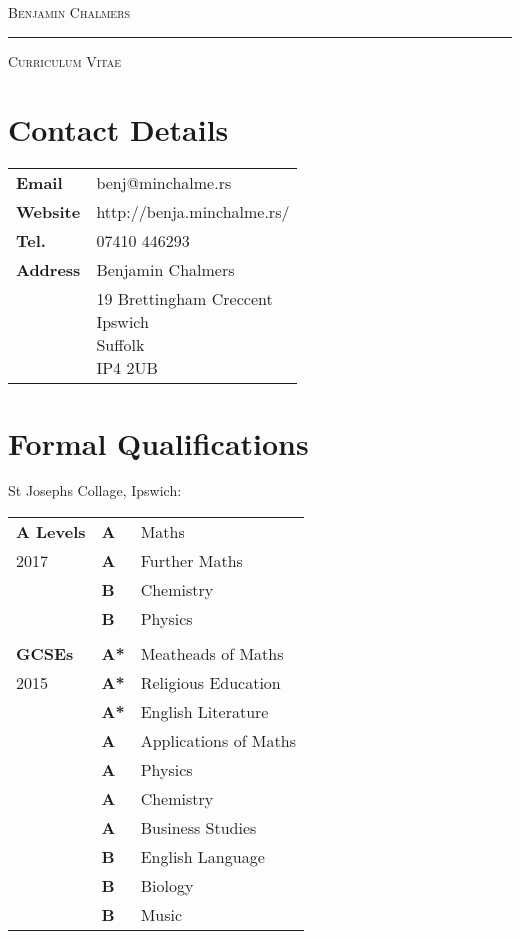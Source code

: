 \documentclass[9pt,a4paper]{article}
\begin{document}
\begin{center}

  \textsc{\Huge{Benjamin Chalmers}}
  \vspace{0.3cm}

  \noindent\rule{0.8\textwidth}{0.4pt}
  \vspace{0.3cm}

  \textsc{\large{Curriculum Vitae}}
  \vspace{0.2cm}

\end{center}
\begin{multicols*}{2}
  \section*{Contact Details} 
\begin{center}
  \begin{tabular}{p{2cm}p{6cm}}
    \textbf{Email}&benj@minchalme.rs\\
    \textbf{Website}&http://benja.minchalme.rs/\\
    \textbf{Tel.}&07410 446293\\
    \textbf{Address}&Benjamin Chalmers\\
    &\parbox{5cm}{19 Brettingham Creccent\\Ipswich\\Suffolk\\IP4 2UB}\\
  \end{tabular}
\end{center}

  \section*{Formal Qualifications}
  \vspace*{-.3cm}
  St Josephs Collage, Ipswich:
  \vspace*{-.6cm}
\begin{center}
  \begin{tabular}{p{2cm} p{0.6cm} p{5.4cm}}
    \textbf{A Levels}&\textbf{A}&Maths\\
	2017&\textbf{A}&Further Maths\\
	    &\textbf{B}&Chemistry\\
	    &\textbf{B}&Physics\\
\\
    \textbf{GCSEs}&\textbf{A*}&Meatheads of Maths\\
	2015&\textbf{A*}&Religious Education\\
	    &\textbf{A*}&English Literature\\
 	    &\textbf{A}&Applications of Maths\\
	    &\textbf{A}&Physics\\
	    &\textbf{A}&Chemistry\\
	    &\textbf{A}&Business Studies\\
	    &\textbf{B}&English Language\\
	    &\textbf{B}&Biology\\
	    &\textbf{B}&Music\\
  \end{tabular}
\end{center}


\end{multicols*}
\end{document}
